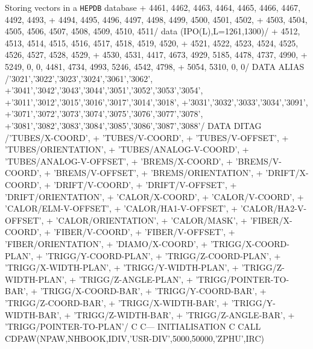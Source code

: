 \begin{XMPt}{Storing vectors in a {\tt HEPDB} database}
     +  4461,  4462,  4463,  4464,  4465,  4466,  4467,  4492,  4493,
     +  4494,  4495,  4496,  4497,  4498,  4499,  4500,  4501,  4502,
     +  4503,  4504,  4505,  4506,  4507,  4508,  4509,  4510,  4511/
      data (IPO(L),L=1261,1300)/
     +  4512,  4513,  4514,  4515,  4516,  4517,  4518,  4519,  4520,
     +  4521,  4522,  4523,  4524,  4525,  4526,  4527,  4528,  4529,
     +  4530,  4531,  4417,  4673,  4929,  5185,  4478,  4737,  4990,
     +  5249,     0,     0,  4481,  4734,  4993,  5246,  4542,  4798,
     +  5054,  5310,     0,     0/
      DATA ALIAS /'3021','3022','3023','3024','3061','3062',
     +'3041','3042','3043','3044','3051','3052','3053','3054',
     +'3011','3012','3015','3016','3017','3014','3018',
     +'3031','3032','3033','3034','3091',
     +'3071','3072','3073','3074','3075','3076','3077','3078',
     +'3081','3082','3083','3084','3085','3086','3087','3088'/
      DATA DITAG /'TUBES/X-COORD',
     +            'TUBES/V-COORD',
     +            'TUBES/V-OFFSET',
     +            'TUBES/ORIENTATION',
     +            'TUBES/ANALOG-V-COORD',
     +            'TUBES/ANALOG-V-OFFSET',
     +            'BREMS/X-COORD',
     +            'BREMS/V-COORD',
     +            'BREMS/V-OFFSET',
     +            'BREMS/ORIENTATION',
     +            'DRIFT/X-COORD',
     +            'DRIFT/V-COORD',
     +            'DRIFT/V-OFFSET',
     +            'DRIFT/ORIENTATION',
     +            'CALOR/X-COORD',
     +            'CALOR/V-COORD',
     +            'CALOR/ELM-V-OFFSET',
     +            'CALOR/HA1-V-OFFSET',
     +            'CALOR/HA2-V-OFFSET',
     +            'CALOR/ORIENTATION',
     +            'CALOR/MASK',
     +            'FIBER/X-COORD',
     +            'FIBER/V-COORD',
     +            'FIBER/V-OFFSET',
     +            'FIBER/ORIENTATION',
     +            'DIAMO/X-COORD',
     +            'TRIGG/X-COORD-PLAN',
     +            'TRIGG/Y-COORD-PLAN',
     +            'TRIGG/Z-COORD-PLAN',
     +            'TRIGG/X-WIDTH-PLAN',
     +            'TRIGG/Y-WIDTH-PLAN',
     +            'TRIGG/Z-WIDTH-PLAN',
     +            'TRIGG/Z-ANGLE-PLAN',
     +            'TRIGG/POINTER-TO-BAR',
     +            'TRIGG/X-COORD-BAR',
     +            'TRIGG/Y-COORD-BAR',
     +            'TRIGG/Z-COORD-BAR',
     +            'TRIGG/X-WIDTH-BAR',
     +            'TRIGG/Y-WIDTH-BAR',
     +            'TRIGG/Z-WIDTH-BAR',
     +            'TRIGG/Z-ANGLE-BAR',
     +            'TRIGG/POINTER-TO-PLAN'/
C
C---      INITIALISATION
C
      CALL CDPAW(NPAW,NHBOOK,IDIV,'USR-DIV',5000,50000,'ZPHU',IRC)

\end{XMPt}
